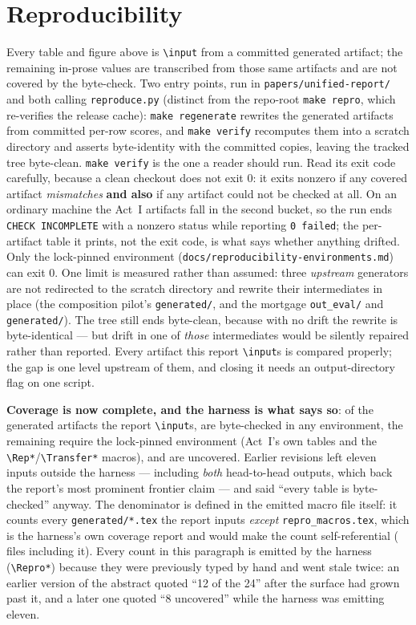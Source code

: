 \documentclass[11pt]{article}
\newcommand{\code}[1]{\texttt{\small #1}}
\begin{document}
\section{Reproducibility}
\label{sec:repro}
Every table and figure above is \code{\textbackslash input} from a committed generated artifact; the
remaining in-prose values are transcribed from those same artifacts and are not covered by the
byte-check. Two entry points, run in \code{papers/unified-report/} and both calling \code{reproduce.py}
(distinct from the repo-root \code{make repro}, which re-verifies the release cache):
\code{make regenerate} rewrites the generated artifacts from committed per-row scores, and
\code{make verify} recomputes them into a scratch directory and asserts byte-identity with the
committed copies, leaving the tracked tree byte-clean. \code{make verify} is the one a reader should
run. Read its exit code carefully, because a clean checkout does not exit $0$: it exits nonzero if any
covered artifact \emph{mismatches} \textbf{and also} if any artifact could not be checked at all. On an
ordinary machine the \ReproNEnvGated{} Act~I artifacts fall in the second bucket, so the run ends
\code{CHECK INCOMPLETE} with a nonzero status while reporting \code{0 failed}; the per-artifact table it
prints, not the exit code, is what says whether anything drifted. Only the lock-pinned environment
(\code{docs/reproducibility-environments.md}) can exit $0$. One limit is measured rather than
assumed: three \emph{upstream} generators are not redirected to the scratch directory and rewrite
their intermediates in place (the composition pilot's \code{generated/}, and the mortgage
\code{out\_eval/} and \code{generated/}). The tree still ends byte-clean, because with no drift the
rewrite is byte-identical --- but drift in one of \emph{those} intermediates would be silently
repaired rather than reported. Every artifact this report \code{\textbackslash input}s is compared
properly; the gap is one level upstream of them, and closing it needs an output-directory flag on one
script.

\textbf{Coverage is now complete, and the harness is what says so}: of the \ReproNInputs{} generated
artifacts the report \code{\textbackslash input}s, \ReproNVerified{} are byte-checked in any
environment, the remaining \ReproNEnvGated{} require the lock-pinned environment (Act~I's own tables
and the \code{\textbackslash Rep*}/\code{\textbackslash Transfer*} macros), and
\ReproNUncovered{} are uncovered. Earlier revisions left eleven inputs outside the harness ---
including \emph{both} head-to-head outputs, which back the report's most prominent frontier claim ---
and said ``every table is byte-checked'' anyway. The denominator is defined in the emitted macro file
itself: it counts every
\code{generated/*.tex} the report inputs \emph{except} \code{repro\_macros.tex}, which is the harness's
own coverage report and would make the count self-referential
(\ReproNInputsInclSelf{} files including it). Every count in this paragraph is emitted by the harness
(\code{\textbackslash Repro*}) because they were previously typed by hand and went stale twice: an
earlier version of the abstract quoted ``12 of the 24'' after the surface had grown past it, and a
later one quoted ``8 uncovered'' while the harness was emitting eleven.
\end{document}
